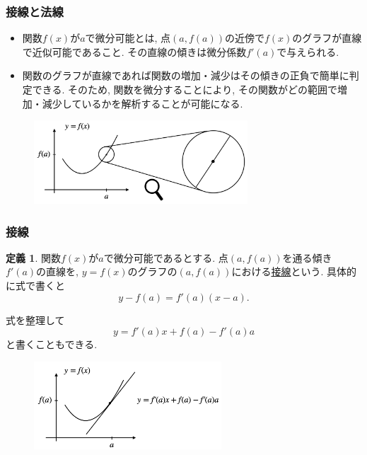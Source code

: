 \documentclass[dvipdfmx,cjk,10.2pt]{beamer}
\theoremstyle{definition}
\newtheorem{Def}[Thm]{定義}
\begin{document}
\begin{frame}
\frametitle{接線と法線}

\begin{itemize}
\item 関数$f(x)$が$a$で微分可能とは, 点$(a,f(a))$の近傍で$f(x)$のグラフが直線で近似可能であること. 
その直線の傾きは微分係数$f'(a)$で与えられる.  
\item 関数のグラフが直線であれば関数の増加・減少はその傾きの正負で簡単に判定できる.  
そのため, 関数を微分することにより, その関数がどの範囲で増加・減少しているかを解析することが可能になる. 
\end{itemize}

 \begin{figure}[htbp]
 \begin{center} 
  \includegraphics[width=80mm]{differentiable2.png}
 \end{center}
\end{figure}




\end{frame}








\begin{frame}
\frametitle{接線}

\vspace{-2mm}

\begin{Def}
関数$f(x)$が$a$で微分可能であるとする. 
点$(a,f(a))$を通る傾き$f'(a)$の直線を, $y=f(x)$のグラフの$(a,f(a))$における\underline{接線}という. 
具体的に式で書くと
$$
y-f(a)=f'(a)(x-a). 
$$
\end{Def}
式を整理して
$$
y=f'(a)x + f(a) -f'(a)a
$$
と書くこともできる. 
\vspace{-2mm}

 \begin{figure}[htbp]
 \begin{center} 
  \includegraphics[width=70mm]{tangent.png}
 \end{center}
\end{figure}


\end{frame}
\end{document}
